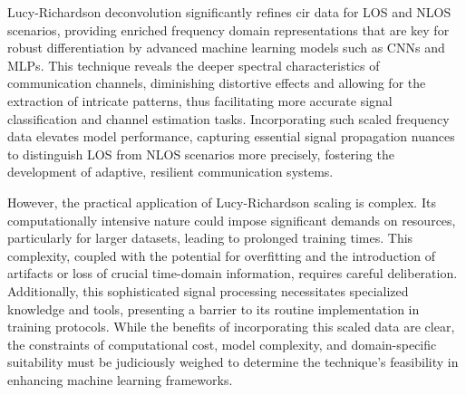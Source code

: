 

Lucy-Richardson deconvolution significantly refines \acrshort{cir} data for LOS and NLOS scenarios, providing enriched frequency domain representations that are key for robust differentiation by advanced machine learning models such as CNNs and MLPs. This technique reveals the deeper spectral characteristics of communication channels, diminishing distortive effects and allowing for the extraction of intricate patterns, thus facilitating more accurate signal classification and channel estimation tasks. Incorporating such scaled frequency data elevates model performance, capturing essential signal propagation nuances to distinguish LOS from NLOS scenarios more precisely, fostering the development of adaptive, resilient communication systems.

However, the practical application of Lucy-Richardson scaling is complex. Its computationally intensive nature could impose significant demands on resources, particularly for larger datasets, leading to prolonged training times. This complexity, coupled with the potential for overfitting and the introduction of artifacts or loss of crucial time-domain information, requires careful deliberation. Additionally, this sophisticated signal processing necessitates specialized knowledge and tools, presenting a barrier to its routine implementation in training protocols. While the benefits of incorporating this scaled data are clear, the constraints of computational cost, model complexity, and domain-specific suitability must be judiciously weighed to determine the technique's feasibility in enhancing machine learning frameworks.

